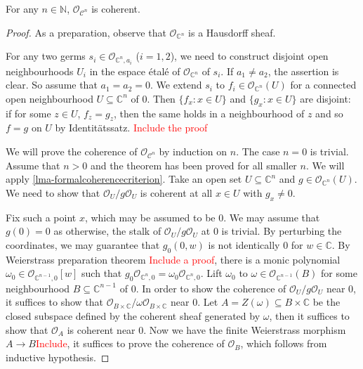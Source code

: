 \begin{lemma}[Oka]\label{lma-Okacoh}
    For any $n\in \mathbb{N}$, $\mathcal{O}_{\mathcal{C}^n}$ is coherent.
\end{lemma}
\begin{proof}
    As a preparation, observe that $\mathcal{O}_{\mathbb{C}^n}$ is a Hausdorff sheaf.
    
    For any two germs $s_i\in \mathcal{O}_{\mathbb{C}^n,a_i}$ ($i=1,2$), we need to construct disjoint open neighbourhoods $U_i$ in the espace étalé of $\mathcal{O}_{\mathbb{C}^n}$ of $s_i$. If $a_1\neq a_2$, the assertion is clear. So assume that $a_1=a_2=0$. We extend $s_i$ to $f_i\in \mathcal{O}_{\mathbb{C}^n}(U)$ for a connected open neighbourhood $U\subseteq \mathbb{C}^n$ of $0$. Then $\{f_x:x\in U\}$ and $\{g_x:x\in U\}$ are disjoint: if for some $z\in U$, $f_z=g_z$, then the same holds in a neighbourhood of $z$ and so $f=g$ on $U$ by Identitätssatz. \textcolor{red}{Include the proof}

    We will prove the coherence of $\mathcal{O}_{\mathcal{C}^n}$ by induction on $n$. The case $n=0$ is trivial. Assume that $n>0$ and the theorem has been proved for all smaller $n$. We will apply \cref{lma-formalcoherencecriterion}. Take an open set $U\subseteq \mathbb{C}^n$ and $g\in \mathcal{O}_{\mathbb{C}^n}(U)$. We need to show that $\mathcal{O}_U/g\mathcal{O}_U$ is coherent at all $x\in U$ with $g_x\neq 0$.

    Fix such a point $x$, which may be assumed to be $0$. We may assume that $g(0)=0$ as otherwise, the stalk of $\mathcal{O}_U/g\mathcal{O}_U$ at $0$ is trivial. By perturbing the coordinates, we may guarantee that $g_0(0,w)$ is not identically $0$ for $w\in \mathbb{C}$. By Weierstrass preparation theorem \textcolor{red}{Include a proof}, there is a monic polynomial $\omega_0\in \mathcal{O}_{\mathbb{C}^{n-1},0}[w]$ such that $g_0\mathcal{O}_{\mathbb{C}^n,0}=\omega_0\mathcal{O}_{\mathbb{C}^n,0}$. Lift $\omega_0$ to $\omega\in \mathcal{O}_{\mathbb{C}^{n-1}}(B)$ for some neighbourhood $B\subseteq \mathbb{C}^{n-1}$ of $0$. In order to show the coherence of $\mathcal{O}_U/g\mathcal{O}_U$ near $0$, it suffices to show that $\mathcal{O}_{B\times \mathbb{C}}/\omega \mathcal{O}_{B\times \mathbb{C}}$ near $0$. Let $A=Z(\omega)\subseteq B\times \mathbb{C}$ be the closed subspace defined by the coherent sheaf generated by $\omega$, then it suffices to show that $\mathcal{O}_{A}$ is coherent near $0$. Now we have the finite Weierstrass morphism $A\rightarrow B$\textcolor{red}{Include}, it suffices to prove the coherence of $\mathcal{O}_B$, which follows from inductive hypothesis.
\end{proof}
